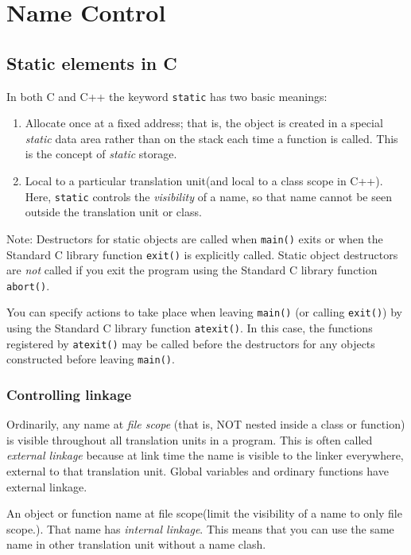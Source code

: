 \documentclass[11pt, a4paper]{book}
\begin{document}
\chapter{Name Control}
\section{Static elements in C}
In both C and C++ the keyword \verb|static| has two basic meanings:
\begin{enumerate}
\item Allocate once at a fixed address; that is, the object is created in a
special \emph{static} data area rather than on the stack each time a function is
called. This is the concept of \emph{static} storage.
\item Local to a particular translation unit(and local to a class scope in C++).
Here, \verb|static| controls the \emph{visibility} of a name, so that name
cannot be seen outside the translation unit or class.
\end{enumerate}

Note: Destructors for static objects are called when \verb|main()| exits or when
the Standard C library function \verb|exit()| is explicitly called. Static
object destructors are \emph{not} called if you exit the program using the
Standard C library function \verb|abort()|.

You can specify actions to take place when leaving \verb|main()| (or calling
\verb|exit()|) by using the Standard C library function \verb|atexit()|. In this
case, the functions registered by \verb|atexit()| may be called before the
destructors for any objects constructed before leaving \verb|main()|.

\subsection{Controlling linkage}
Ordinarily, any name at \emph{file scope} (that is, NOT nested inside a class or
function) is visible throughout all translation units in a program. This is
often called \emph{external linkage} because at link time the name is visible to
the linker everywhere, external to that translation unit. Global variables and
ordinary functions have external linkage.

An object or function name at file scope(limit the visibility of a name to only
file scope.). That name has \emph{internal linkage}. This means that you can use
the same name in other translation unit without a name clash.
\end{document}
